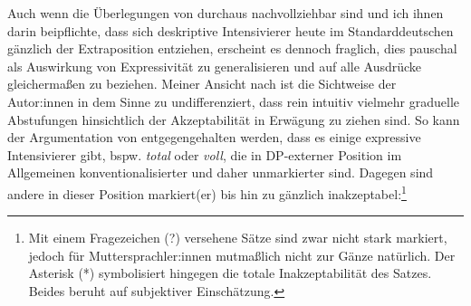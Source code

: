 Auch wenn die Überlegungen von \citet[]{Gutzmann.2012} durchaus nachvollziehbar sind und ich ihnen darin beipflichte, dass sich deskriptive Intensivierer heute im Standarddeutschen gänzlich der Extraposition entziehen, erscheint es dennoch fraglich, dies pauschal als Auswirkung von Expressivität zu generalisieren und auf alle Ausdrücke gleichermaßen zu beziehen. Meiner Ansicht nach ist die Sichtweise der Autor:innen in dem Sinne zu undifferenziert, dass rein intuitiv vielmehr graduelle Abstufungen hinsichtlich der Akzeptabilität in Erwägung zu ziehen sind. So kann der Argumentation von \citet[]{Gutzmann.2012} entgegengehalten werden, dass es einige expressive Intensivierer gibt, bspw. \textit{total} oder \textit{voll}, die in DP-externer Position im Allgemeinen konventionalisierter und daher unmarkierter sind. Dagegen sind andere in dieser Position markiert(er) bis hin zu gänzlich {inakzeptabel}:\footnote{Mit einem Fragezeichen (?) versehene Sätze sind zwar nicht stark markiert, jedoch für Muttersprachler:innen mutmaßlich nicht zur Gänze natürlich. Der Asterisk (*) symbolisiert hingegen die totale Inakzeptabilität des Satzes. Beides beruht auf subjektiver Einschätzung.}

